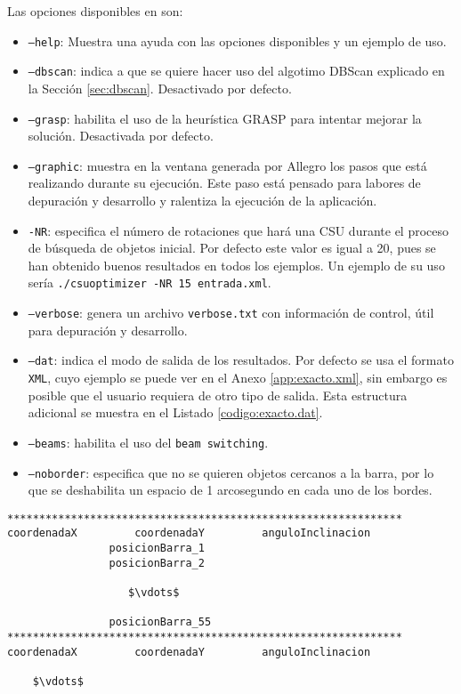 Las opciones disponibles en \CSUO{} son: 
\begin{itemize}
\item \texttt{--help}: Muestra una ayuda con las opciones disponibles y un
ejemplo de uso.
\item \texttt{--dbscan}: indica a \CSUO{} que se quiere hacer uso
del algotimo DBScan explicado en la Sección \ref{sec:dbscan}. Desactivado por
defecto.
\item \texttt{--grasp}: habilita el uso de la heurística GRASP para intentar
mejorar la solución. Desactivada por defecto.
\item \texttt{--graphic}: muestra en la ventana generada por Allegro los pasos
que está realizando \CSUO{} durante su ejecución. Este paso está
pensado para labores de depuración y desarrollo y ralentiza la ejecución de la
aplicación.
\item \texttt{-NR}: especifica el número de rotaciones que hará una CSU durante
el proceso de búsqueda de objetos inicial. Por defecto este valor es igual a 20,
pues se han obtenido buenos resultados en todos los ejemplos. Un ejemplo de su
uso sería \texttt{./csuoptimizer -NR 15 entrada.xml}.
\item \texttt{--verbose}: genera un archivo \texttt{verbose.txt} con información
de control, útil para depuración y desarrollo.
\item \texttt{--dat}: indica el modo de salida de los resultados. Por defecto se
usa el formato \texttt{XML}, cuyo ejemplo se puede ver en el Anexo
\ref{app:exacto.xml}, sin embargo es posible que el usuario requiera de otro
tipo de salida. Esta estructura adicional se muestra en el Listado
\ref{codigo:exacto.dat}.
\item \texttt{--beams}: habilita el uso del \texttt{beam switching}.
\item \texttt{--noborder}: especifica que no se quieren objetos cercanos a la
barra, por lo que se deshabilita un espacio de 1 arcosegundo en cada uno de los
bordes.
\end{itemize}


\begin{lstlisting}[float=tpb,
                   numbers=none,mathescape,
                   caption={Estructura del modo de resultado \texttt{.dat}},
                   label={codigo:exacto.dat}]
**************************************************************
coordenadaX			coordenadaY			anguloInclinacion
				posicionBarra_1
				posicionBarra_2

				   $\vdots$

				posicionBarra_55
**************************************************************
coordenadaX			coordenadaY			anguloInclinacion

    $\vdots$

\end{lstlisting}


